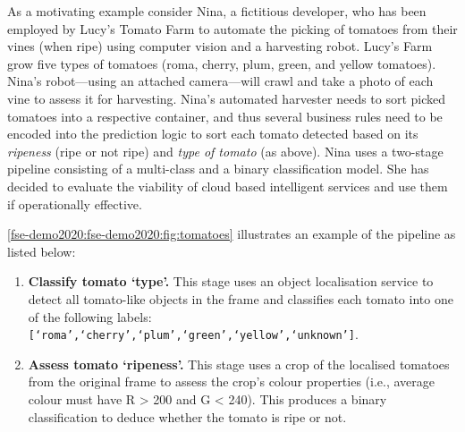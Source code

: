 As a motivating example consider Nina, a fictitious developer, who has been employed by Lucy's Tomato Farm to automate the picking of tomatoes from their vines (when ripe) using computer vision and a harvesting robot. Lucy's Farm grow five types of tomatoes (roma, cherry, plum, green, and yellow tomatoes). Nina's robot---using an attached camera---will crawl and take a photo of each vine to assess it for harvesting.
Nina's automated harvester needs to sort picked tomatoes into a respective container, and thus several business rules need to be encoded into the prediction logic to sort each tomato detected based on its \textit{ripeness} (ripe or not ripe) and \textit{type of tomato} (as above).
Nina uses a two-stage pipeline consisting of a multi-class and a binary classification model. She has decided to evaluate the viability of cloud based intelligent services and use them if operationally effective.

\cref{fse-demo2020:fse-demo2020:fig:tomatoes} illustrates an example of the pipeline as listed below:

\begin{enumerate}
    \item \textbf{Classify tomato `type'.} This stage uses an object localisation service to detect all tomato-like objects in the frame and classifies each tomato into one of the following labels: \texttt{[`roma',`cherry',`plum',`green',`yellow',`unknown']}.
    \item \textbf{Assess tomato `ripeness'.} This stage uses a crop of the localised tomatoes from the original frame to assess the crop's colour properties (i.e., average colour must have R > 200 and G < 240). This produces a binary classification to deduce whether the tomato is ripe or not.
\end{enumerate}

